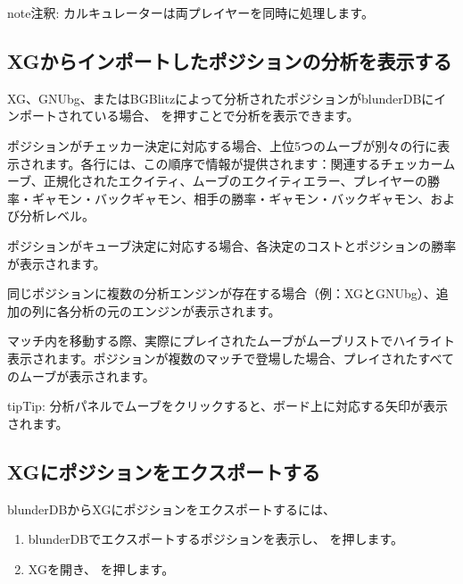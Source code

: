 \documentclass[letterpaper,10pt,dvipdfmx]{sphinxmanual}
\begin{document}
\begin{sphinxadmonition}{note}{注釈:}
\sphinxAtStartPar
カルキュレーターは両プレイヤーを同時に処理します。
\end{sphinxadmonition}


\subsection{XGからインポートしたポジションの分析を表示する}
\label{\detokenize{guide_utilisateur:afficher-l-analyse-d-une-position-importee-depuis-xg}}
\sphinxAtStartPar
XG、GNUbg、またはBGBlitzによって分析されたポジションがblunderDBにインポートされている場合、 を押すことで分析を表示できます。

\sphinxAtStartPar
ポジションがチェッカー決定に対応する場合、上位5つのムーブが別々の行に表示されます。各行には、この順序で情報が提供されます：関連するチェッカームーブ、正規化されたエクイティ、ムーブのエクイティエラー、プレイヤーの勝率・ギャモン・バックギャモン、相手の勝率・ギャモン・バックギャモン、および分析レベル。

\sphinxAtStartPar
ポジションがキューブ決定に対応する場合、各決定のコストとポジションの勝率が表示されます。

\sphinxAtStartPar
同じポジションに複数の分析エンジンが存在する場合（例：XGとGNUbg）、追加の列に各分析の元のエンジンが表示されます。

\sphinxAtStartPar
マッチ内を移動する際、実際にプレイされたムーブがムーブリストでハイライト表示されます。ポジションが複数のマッチで登場した場合、プレイされたすべてのムーブが表示されます。

\begin{sphinxadmonition}{tip}{Tip:}
\sphinxAtStartPar
分析パネルでムーブをクリックすると、ボード上に対応する矢印が表示されます。
\end{sphinxadmonition}


\subsection{XGにポジションをエクスポートする}
\label{\detokenize{guide_utilisateur:exporter-une-position-vers-xg}}
\sphinxAtStartPar
blunderDBからXGにポジションをエクスポートするには、
\begin{enumerate}
%
\item {} 
\sphinxAtStartPar
blunderDBでエクスポートするポジションを表示し、 を押します。

\item {} 
\sphinxAtStartPar
XGを開き、 を押します。

\end{enumerate}
\end{document}
